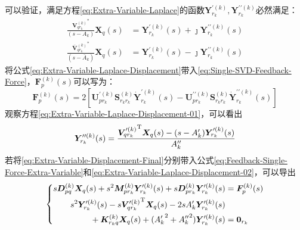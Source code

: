 可以验证，满足方程\eqref{eq:Extra-Variable-Laplace}的函数$\boldsymbol{Y}_{r_k}^{\prime(k)}, \boldsymbol{Y}_{r_k}^{\prime\prime(k)}$必然满足：
\begin{subequations}
	\label{eq:Extra-Variable-Laplace-Displacement}
	\begin{align}
		{\displaystyle\frac{{\boldsymbol{V}_{qr_k}^{(k)}}^{*}}{(s-A_k)}} \boldsymbol{X}_q(s)&= \boldsymbol{Y}_{r_k}^{\prime(k)}(s)+ \jmath\boldsymbol{Y}_{r_k}^{\prime\prime(k)}(s)  \label{eq:Extra-Variable-Laplace-Displacement-01}\\
		{\displaystyle\frac{\boldsymbol{\bar{V}}{{}_{qr_k}^{(k)}}^{*}}{(s-\bar{A}_k)}} \boldsymbol{X}_q(s)&= \boldsymbol{Y}_{r_k}^{\prime(k)}(s)- \jmath\boldsymbol{Y}_{r_k}^{\prime\prime(k)}(s)  \label{eq:Extra-Variable-Laplace-Displacement-02}
	\end{align}
\end{subequations}
将公式\eqref{eq:Extra-Variable-Laplace-Displacement}带入\eqref{eq:Single-SVD-Feedback-Force}，$\boldsymbol{F}_p^{(k)}(s)$可以写为：
\begin{equation}
	\label{eq:Feedback-Single-Force-Extra-Variable}
	\boldsymbol{F}_p^{(k)}(s)=2\left[ \boldsymbol{U}_{pr_k}^{\prime(k)}\boldsymbol{S}_{r_kr_k}^{(k)} \dot{\boldsymbol{Y}}_{r_k}^{\prime(k)}(s)-
	\boldsymbol{U}_{pr_k}^{\prime\prime(k)}\boldsymbol{S}_{r_kr_k}^{(k)} \dot{\boldsymbol{Y}}_{r_k}^{\prime\prime(k)}(s)
	\right]
\end{equation}
观察方程\eqref{eq:Extra-Variable-Laplace-Displacement-01}，可以看出
\begin{equation}
	\label{eq:Extra-Variable-Displacement-Final}
	\boldsymbol{Y}_{r_k}^{\prime\prime(k)}(s)= {\displaystyle\frac{{\boldsymbol{V}_{qr_k}^{\prime(k)}}^{\ut} \boldsymbol{X}_q(s)-(s-A'_k)\boldsymbol{Y}_{r_k}^{\prime(k)}(s)}{A''_k}}
\end{equation}
若将\eqref{eq:Extra-Variable-Displacement-Final}分别带入公式\eqref{eq:Feedback-Single-Force-Extra-Variable}和\eqref{eq:Extra-Variable-Laplace-Displacement-02}，可以导出
\begin{equation}
	\label{eq:Feedback-Force-Final}
	\left\{
	\begin{aligned}
		s\boldsymbol{D}_{pq}^{(k)}\boldsymbol{X}_{q}(s)+ s^2\boldsymbol{M}_{pr_k}^{(k)}\boldsymbol{Y}_{r_k}^{\prime(k)}(s)+ s\boldsymbol{D}_{pr_k}^{(k)}\boldsymbol{Y}_{r_k}^{\prime(k)}(s) &= \boldsymbol{F}_{p}^{(k)}(s) \\ 
	 	s^{2}\boldsymbol{Y}_{r_k}^{\prime(k)}(s)-s{\boldsymbol{V}_{qr_k}^{\prime(k)}}^{\ut} \boldsymbol{X}_{q}(s)- 2sA'_k\boldsymbol{Y}_{r_k}^{\prime(k)}(s) \\
	 	\qquad {} + \boldsymbol{K}_{r_kq}^{(k)}\boldsymbol{X}_{q}(s)+ ({A'_k}^2+{A''_k}^{2})\boldsymbol{Y}_{r_k}^{\prime(k)}(s) &=  \boldsymbol{0}_{r_k}
	\end{aligned} \right.
\end{equation}
